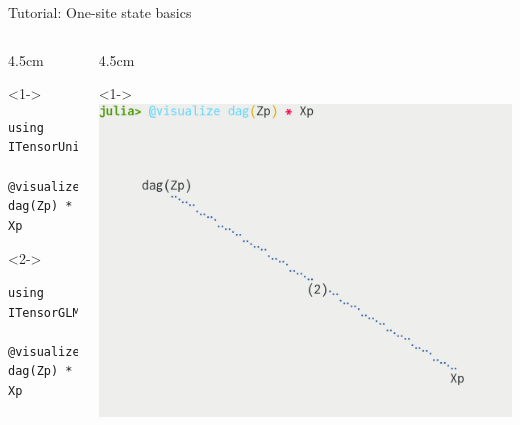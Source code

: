 \begin{frame}[fragile]{Tutorial: One-site state basics}

\begin{columns}

\begin{column}{4.5cm}

\begin{onlyenv}<1->
\vspace*{-1.0cm}
\begin{lstlisting}[language=JuliaLocal, style=julia, basicstyle=\small]
using ITensorUnicodePlots

@visualize dag(Zp) * Xp
\end{lstlisting}

\end{onlyenv}

\begin{onlyenv}<2->
\vspace*{1.5cm}
\begin{lstlisting}[language=JuliaLocal, style=julia, basicstyle=\small]
using ITensorGLMakie

@visualize dag(Zp) * Xp
\end{lstlisting}

\end{onlyenv}

\end{column}

\begin{column}{4.5cm}

\begin{onlyenv}<1->
\includegraphics[width=1.0\textwidth]{
  slides/assets/ZpXp_unicode.png
}
\end{onlyenv}


\end{column}
\end{columns}
\end{frame}

